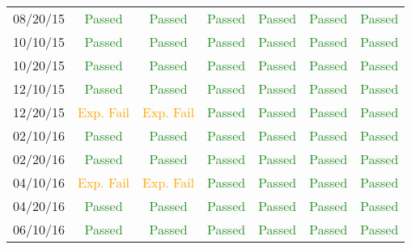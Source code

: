 \documentclass[]{BasiliskReportMemo}
\begin{document}
\begin{table}[htbp]
\begin{tabular}{c | c | c | c | c | c | c}
      08/20/15 & \textcolor{ForestGreen}{Passed} & \textcolor{ForestGreen}{Passed} &  \textcolor{ForestGreen}{Passed}&  \textcolor{ForestGreen}{Passed} & \textcolor{ForestGreen}{Passed} &  \textcolor{ForestGreen}{Passed}\\
      10/10/15 & \textcolor{ForestGreen}{Passed} & \textcolor{ForestGreen}{Passed} &  \textcolor{ForestGreen}{Passed}&  \textcolor{ForestGreen}{Passed} & \textcolor{ForestGreen}{Passed} &  \textcolor{ForestGreen}{Passed}\\
      10/20/15 & \textcolor{ForestGreen}{Passed} & \textcolor{ForestGreen}{Passed} &  \textcolor{ForestGreen}{Passed}&  \textcolor{ForestGreen}{Passed} & \textcolor{ForestGreen}{Passed} &  \textcolor{ForestGreen}{Passed}\\
      12/10/15 & \textcolor{ForestGreen}{Passed} & \textcolor{ForestGreen}{Passed} &  \textcolor{ForestGreen}{Passed}&  \textcolor{ForestGreen}{Passed} & \textcolor{ForestGreen}{Passed} &  \textcolor{ForestGreen}{Passed}\\
      12/20/15 & \textcolor{orange}{Exp. Fail} & \textcolor{orange}{Exp. Fail} &  \textcolor{ForestGreen}{Passed}&  \textcolor{ForestGreen}{Passed} & \textcolor{ForestGreen}{Passed} &  \textcolor{ForestGreen}{Passed}\\
      02/10/16 & \textcolor{ForestGreen}{Passed} & \textcolor{ForestGreen}{Passed} &  \textcolor{ForestGreen}{Passed}&  \textcolor{ForestGreen}{Passed} & \textcolor{ForestGreen}{Passed} &  \textcolor{ForestGreen}{Passed}\\
      02/20/16 & \textcolor{ForestGreen}{Passed} & \textcolor{ForestGreen}{Passed} &  \textcolor{ForestGreen}{Passed}&  \textcolor{ForestGreen}{Passed} & \textcolor{ForestGreen}{Passed} &  \textcolor{ForestGreen}{Passed}\\
      04/10/16 & \textcolor{orange}{Exp. Fail} & \textcolor{orange}{Exp. Fail} &  \textcolor{ForestGreen}{Passed}&  \textcolor{ForestGreen}{Passed} & \textcolor{ForestGreen}{Passed} &  \textcolor{ForestGreen}{Passed}\\
      04/20/16 & \textcolor{ForestGreen}{Passed} & \textcolor{ForestGreen}{Passed} &  \textcolor{ForestGreen}{Passed}&  \textcolor{ForestGreen}{Passed} & \textcolor{ForestGreen}{Passed} &  \textcolor{ForestGreen}{Passed}\\
      06/10/16 & \textcolor{ForestGreen}{Passed} & \textcolor{ForestGreen}{Passed} &  \textcolor{ForestGreen}{Passed}&  \textcolor{ForestGreen}{Passed} & \textcolor{ForestGreen}{Passed} &  \textcolor{ForestGreen}{Passed}\\

\end{tabular}
\end{table}
\end{document}
